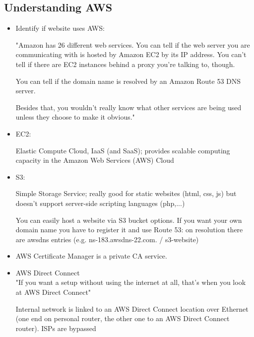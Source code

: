 \documentclass[12pt]{article}
\begin{document}
\newpage
\subsection*{Understanding AWS}
\begin{itemize}
    \item Identify if website uses AWS:
    
    "Amazon has 26 different web services. You can tell if the web server you are communicating with is hosted by Amazon EC2 by its IP address. You can't tell if there are EC2 instances behind a proxy you're talking to, though.

    You can tell if the domain name is resolved by an Amazon Route 53 DNS server.

    Besides that, you wouldn't really know what other services are being used unless they choose to make it obvious."
    
    \item EC2:
    
    Elastic Compute Cloud, IaaS (and SaaS); provides scalable computing capacity in the Amazon Web Services (AWS) Cloud
    
    \item S3:
    
    Simple Storage Service; really good for static websites (html, css, js) but doesn't support server-side scripting languages (php,...)
    
    You can easily host a website via S3 bucket options. If you want your own domain name you have to register it and use Route 53: on resolution there are awsdns entries (e.g. ns-183.awsdns-22.com. / s3-website)
    
    \item AWS Certificate Manager is a private CA service.
    
    \item AWS Direct Connect \\
    "If you want a setup without using the internet at all, that's when you look at AWS Direct Connect" 
    
    Internal network is linked to an AWS Direct Connect location over Ethernet (one end on personal router, the other one to an AWS Direct Connect router). ISPs are bypassed
    
    
    
\end{itemize}
\end{document}
